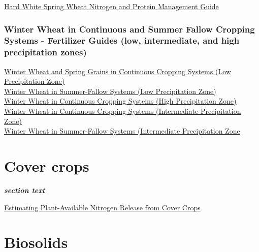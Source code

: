 \documentclass[
  letterpaper,
  DIV=11,
  numbers=noendperiod]{scrreprt}
\begin{document}
\href{https://wpcdn.web.wsu.edu/cahnrs/uploads/sites/16/Hard-White-Spring-Wheat-Nitrogen-and-Protein-Brief-from-the-WA-Grain-Commission-1.pdf}{Hard
White Spring Wheat Nitrogen and Protein Management Guide}

\subsubsection{Winter Wheat in Continuous and Summer Fallow Cropping
Systems - Fertilizer Guides (low, intermediate, and high precipitation
zones)}\label{winter-wheat-in-continuous-and-summer-fallow-cropping-systems---fertilizer-guides-low-intermediate-and-high-precipitation-zones}

\href{https://extension.oregonstate.edu/catalog/pub/fg-81-winter-wheat-spring-grains-continuous-cropping-systems-low-precipitation-zone}{Winter
Wheat and Spring Grains in Continuous Cropping Systems (Low
Precipitation Zone)}\\
\href{https://extension.oregonstate.edu/catalog/pub/fg-80-winter-wheat-summer-fallow-systems-low-precipitation-zone-fertilizer-guide}{Winter
Wheat in Summer-Fallow Systems (Low Precipitation Zone)}\\
\href{https://extension.oregonstate.edu/catalog/pub/fg-84-winter-wheat-continuous-cropping-systems-high-precipitation-zone-fertilizer-guide}{Winter
Wheat in Continuous Cropping Systems (High Precipitation Zone)}\\
\href{https://extension.oregonstate.edu/catalog/pub/fg-83-winter-wheat-continuous-cropping-systems-intermediate-precipitation-zone}{Winter
Wheat in Continuous Cropping Systems (Intermediate Precipitation
Zone)}\\
\href{https://extension.oregonstate.edu/catalog/pub/fg-82-winter-wheat-summer-fallow-systems-intermediate-precipitation-zone-fertilizer}{Winter
Wheat in Summer-Fallow Systems (Intermediate Precipitation Zone}

\section{Cover crops}\label{cover-crops}

\textbf{\emph{section text}}

\href{https://extension.oregonstate.edu/catalog/pub/pnw-636-estimating-plant-available-nitrogen-release-cover-crops}{Estimating
Plant-Available Nitrogen Release from Cover Crops}

\section{Biosolids}\label{biosolids}
\end{document}
